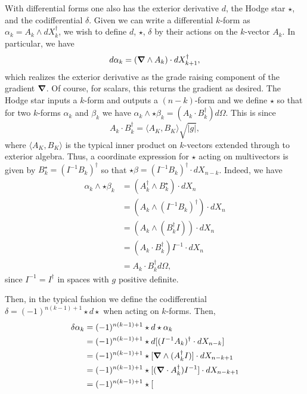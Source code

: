 \documentclass[12pt]{article}
\begin{document}
With differential forms one also has the exterior derivative $d$, the Hodge star $\star$, and the codifferential $\delta$.  Given we can write a differential $k$-form as $\alpha_k = A_k \wedge dX_k^\dagger$, we wish to define $d$, $\star$, $\delta$ by their actions on the $k$-vector $A_k$.  In particular, we have
\[
d \alpha_k = (\boldsymbol{\nabla} \wedge A_k) \cdot dX_{k+1}^\dagger,
\]
which realizes the exterior derivative as the grade raising component of the gradient $\boldsymbol{\nabla}$. Of course, for scalars, this returns the gradient as desired.  The Hodge star inputs a $k$-form and outputs a $(n-k)$-form and we define $\star$ so that for two $k$-forms $\alpha_k$ and $\beta_k$ we have $\alpha_k \wedge \star \beta_k  = (A_k\cdot B_k^\dagger)d\Omega$.  This is since
\[
A_k \cdot B_k^\dagger = \langle A_{K}, B_{K} \rangle \sqrt{|g|},
\]
where $\langle A_{K}, B_{K} \rangle$ is the typical inner product on $k$-vectors extended through to exterior algebra. Thus, a coordinate expression for $\star$ acting on multivectors is given by $B_k^\star = (I^{-1} B_k)^\dagger$ so that $\star \beta = (I^{-1} B_k)^\dagger \cdot dX_{n-k}$.  Indeed, we have
\begin{align*}
    \alpha_k \wedge \star \beta_k &= (A_k^\dagger \wedge B_k^\star) \cdot dX_n\\
    &= (A_k \wedge (I^{-1}B_k)^\dagger )\cdot dX_n\\
    &= (A_k \wedge (B_k^\dagger I))\cdot dX_n\\
    &= (A_k \cdot B_k^\dagger) I^{-1} \cdot dX_n\\
    &= A_k \cdot B_k^\dagger d\Omega,
\end{align*}
since $I^{-1}=I^\dagger$ in spaces with $g$ positive definite.


Then, in the typical fashion we define the codifferential $\delta = (-1)^{n(k-1)+1} \star d \star$ when acting on $k$-forms.  Then,
\begin{align*}
    \delta \alpha_k &= (-1)^{n(k-1)+1} \star d \star \alpha_k \\
    &= (-1)^{n(k-1)+1} \star d [(I^{-1} A_k)^\dagger  \cdot dX_{n-k}]\\
    &= (-1)^{n(k-1)+1} \star [\boldsymbol{\nabla} \wedge (A_k^\dagger I)] \cdot dX_{n-k+1}\\
    &= (-1)^{n(k-1)+1} \star [(\boldsymbol{\nabla} \cdot A_k^\dagger)I^{-1} ] \cdot dX_{n-k+1}\\
    &= (-1)^{n(k-1)+1} \star [
\end{align*}
\end{document}
